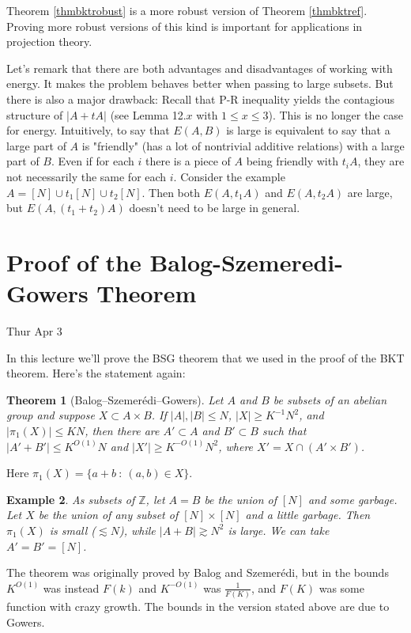 \documentclass[12pt]{amsart}
\newtheorem{theorem}{Theorem}[section]
\newtheorem{example}[theorem]{Example}
\newcommand{\Z}{\mathbb{Z}}
\begin{document}
Theorem \ref{thmbktrobust} is a more robust version of Theorem \ref{thmbktref}.  Proving more robust versions of this kind is important for applications in projection theory.

Let's remark that there are both advantages and disadvantages of working with energy. It makes the problem behaves better when passing to large subsets. But there is also a major drawback: Recall that P-R inequality yields the  contagious structure of $|A+tA|$ (see Lemma 12.$x$ with $1 \le x \le 3$). This is no longer the case for energy. Intuitively, to say that $E(A,B)$ is large is equivalent to say that a large part of $A$ is "friendly" (has a lot of nontrivial additive relations) with a large part of $B$. Even if for each $i$ there is a piece of $A$ being friendly with $t_i A$, they are not necessarily the same for each $i$. Consider the example $A = [N] \cup t_1[N] \cup t_2[N]$. Then both $E(A,t_1 A)$ and $E(A,t_2A)$ are large, but $E(A, (t_1+t_2)A)$ doesn't need to be large in general.


\newpage

\section{Proof of the Balog-Szemeredi-Gowers Theorem}

Thur Apr 3

In this lecture we'll prove the BSG theorem that we used in the proof of the BKT theorem. Here's the statement again:
\begin{theorem}[Balog--Szemer\'edi--Gowers]
    Let $A$ and $B$ be subsets of an abelian group and suppose $X \subset A \times B$. If $|A|, |B| \leq N$, $|X| \geq K^{-1} N^2$, and $|\pi_1(X)| \leq KN$, then there are $A' \subset A$ and $B' \subset B$ such that $|A' + B'| \leq K^{O(1)} N$ and $|X'| \geq K^{-O(1)} N^2$, where $X' = X \cap (A' \times B')$.
\end{theorem}
Here $\pi_1(X) = \{ a + b \ : \ (a, b) \in X \}$.
\begin{example}
    As subsets of $\Z$, let $A = B$ be the union of $[N]$ and some garbage. Let $X$ be the union of any subset of $[N] \times [N]$ and a little garbage. Then $\pi_1(X)$ is small ($\lesssim N$), while $|A + B| \gtrsim N^2$ is large. We can take $A' = B' = [N]$.
\end{example}
The theorem was originally proved by Balog and Szemer\'edi, but in the bounds $K^{O(1)}$ was instead $F(k)$ and $K^{-O(1)}$ was $\frac{1}{F(K)}$, and $F(K)$ was some function with crazy growth. The bounds in the version stated above are due to Gowers.
\end{document}
